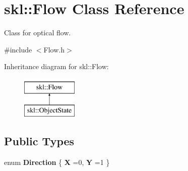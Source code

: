 \hypertarget{classskl_1_1_flow}{}\section{skl\+:\+:Flow Class Reference}
\label{classskl_1_1_flow}


Class for optical flow.  




{\ttfamily \#include $<$Flow.\+h$>$}

Inheritance diagram for skl\+:\+:Flow\+:\begin{figure}[H]
\begin{center}
\leavevmode
\includegraphics[height=2.000000cm]{classskl_1_1_flow}
\end{center}
\end{figure}
\subsection*{Public Types}
\begin{DoxyCompactItemize}
\item 
\hypertarget{classskl_1_1_flow_a13fd439f2bea3c780a8db9869513f05c}{}\label{classskl_1_1_flow_a13fd439f2bea3c780a8db9869513f05c} 
enum {\bfseries Direction} \{ {\bfseries X} =0, 
{\bfseries Y} =1
 \}
\end{DoxyCompactItemize}
